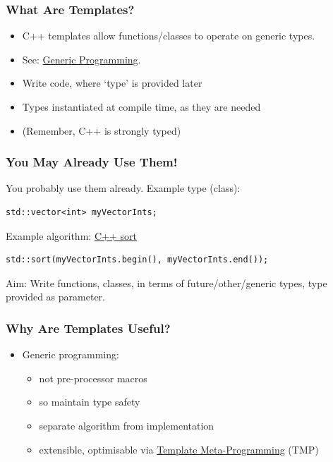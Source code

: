 \subsubsection{What Are Templates?}\label{what-are-templates}

\begin{itemize}
\itemsep1pt\parskip0pt
\item
  C++ templates allow functions/classes to operate on generic types.
\item
  See: \href{http://en.wikipedia.org/wiki/Generic_programming}{Generic
  Programming}.
\item
  Write code, where `type' is provided later
\item
  Types instantiated at compile time, as they are needed
\item
  (Remember, C++ is strongly typed)
\end{itemize}

\subsubsection{You May Already Use
Them!}\label{you-may-already-use-them}

You probably use them already. Example type (class):

\begin{verbatim}
std::vector<int> myVectorInts;
\end{verbatim}

Example algorithm:
\href{http://www.cplusplus.com/reference/algorithm/sort/}{C++ sort}

\begin{verbatim}
std::sort(myVectorInts.begin(), myVectorInts.end());
\end{verbatim}

Aim: Write functions, classes, in terms of future/other/generic types,
type provided as parameter.

\subsubsection{Why Are Templates
Useful?}\label{why-are-templates-useful}

\begin{itemize}
\itemsep1pt\parskip0pt
\item
  Generic programming:

  \begin{itemize}
  \itemsep1pt\parskip0pt
  \item
    not pre-processor macros
  \item
    so maintain type safety
  \item
    separate algorithm from implementation
  \item
    extensible, optimisable via \href{97TemplateMetaProg}{Template
    Meta-Programming} (TMP)
  \end{itemize}
\end{itemize}

